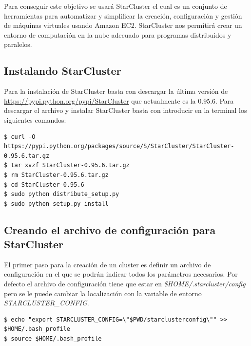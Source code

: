 \documentclass{article}
\begin{document}
	Para conseguir este objetivo se usará StarCluster el cual es un conjunto de herramientas para automatizar y simplificar la creación, configuración y gestión de máquinas virtuales usando Amazon EC2. StarCluster nos permitirá crear un entorno de computación en la nube adecuado para programas distribuidos y paralelos.
	
\subsection{Instalando StarCluster}\label{sec:InstallStarCluster}
	Para la instalación de StarCluster basta con descargar la última versión de \url{https://pypi.python.org/pypi/StarCluster} que actualmente es la 0.95.6. Para descargar el archivo y instalar StarCluster basta con introducir en la terminal los siguientes comandos\cite{InstallingStarCluster}:
\begin{lstlisting}[style=minibash]
$ curl -O https://pypi.python.org/packages/source/S/StarCluster/StarCluster-0.95.6.tar.gz
$ tar xvzf StarCluster-0.95.6.tar.gz
$ rm StarCluster-0.95.6.tar.gz
$ cd StarCluster-0.95.6
$ sudo python distribute_setup.py
$ sudo python setup.py install
\end{lstlisting}

\subsection{Creando el archivo de configuración para StarCluster}
	El primer paso para la creación de un cluster es definir un archivo de configuración en el que se podrán indicar todos los parámetros necesarios. Por defecto el archivo de configuración tiene que estar en \emph{\$HOME/.starcluster/config} pero se le puede cambiar la localización con la variable de entorno \emph{STARCLUSTER\_CONFIG}\cite{StarClusterUserManual}.
\begin{lstlisting}[style=minibash]
$ echo "export STARCLUSTER_CONFIG=\"$PWD/starclusterconfig\"" >> $HOME/.bash_profile 
$ source $HOME/.bash_profile
\end{lstlisting}
\end{document}
